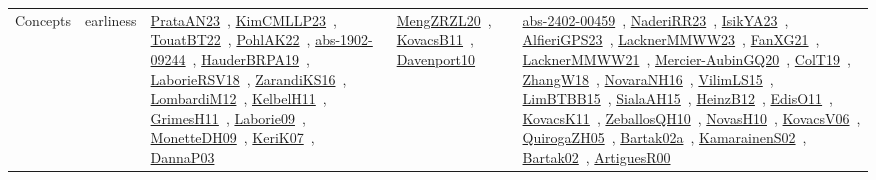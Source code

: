 {\begin{longtable}{lp{3cm}>{\raggedright\arraybackslash}p{6cm}>{\raggedright\arraybackslash}p{6cm}>{\raggedright\arraybackslash}p{8cm}}
Concepts & earliness & \href{articles/PrataAN23.pdf}{PrataAN23}~\cite{PrataAN23}, \href{papers/KimCMLLP23.pdf}{KimCMLLP23}~\cite{KimCMLLP23}, \href{papers/TouatBT22.pdf}{TouatBT22}~\cite{TouatBT22}, \href{articles/PohlAK22.pdf}{PohlAK22}~\cite{PohlAK22}, \href{articles/abs-1902-09244.pdf}{abs-1902-09244}~\cite{abs-1902-09244}, \href{articles/HauderBRPA19.pdf}{HauderBRPA19}~\cite{HauderBRPA19}, \href{articles/LaborieRSV18.pdf}{LaborieRSV18}~\cite{LaborieRSV18}, \href{articles/ZarandiKS16.pdf}{ZarandiKS16}~\cite{ZarandiKS16}, \href{articles/LombardiM12.pdf}{LombardiM12}~\cite{LombardiM12}, \href{articles/KelbelH11.pdf}{KelbelH11}~\cite{KelbelH11}, \href{papers/GrimesH11.pdf}{GrimesH11}~\cite{GrimesH11}, \href{papers/Laborie09.pdf}{Laborie09}~\cite{Laborie09}, \href{papers/MonetteDH09.pdf}{MonetteDH09}~\cite{MonetteDH09}, \href{papers/KeriK07.pdf}{KeriK07}~\cite{KeriK07}, \href{papers/DannaP03.pdf}{DannaP03}~\cite{DannaP03} & \href{articles/MengZRZL20.pdf}{MengZRZL20}~\cite{MengZRZL20}, \href{articles/KovacsB11.pdf}{KovacsB11}~\cite{KovacsB11}, \href{papers/Davenport10.pdf}{Davenport10}~\cite{Davenport10} & \href{articles/abs-2402-00459.pdf}{abs-2402-00459}~\cite{abs-2402-00459}, \href{articles/NaderiRR23.pdf}{NaderiRR23}~\cite{NaderiRR23}, \href{articles/IsikYA23.pdf}{IsikYA23}~\cite{IsikYA23}, \href{articles/AlfieriGPS23.pdf}{AlfieriGPS23}~\cite{AlfieriGPS23}, \href{articles/LacknerMMWW23.pdf}{LacknerMMWW23}~\cite{LacknerMMWW23}, \href{articles/FanXG21.pdf}{FanXG21}~\cite{FanXG21}, \href{papers/LacknerMMWW21.pdf}{LacknerMMWW21}~\cite{LacknerMMWW21}, \href{papers/Mercier-AubinGQ20.pdf}{Mercier-AubinGQ20}~\cite{Mercier-AubinGQ20}, \href{papers/ColT19.pdf}{ColT19}~\cite{ColT19}, \href{articles/ZhangW18.pdf}{ZhangW18}~\cite{ZhangW18}, \href{articles/NovaraNH16.pdf}{NovaraNH16}~\cite{NovaraNH16}, \href{papers/VilimLS15.pdf}{VilimLS15}~\cite{VilimLS15}, \href{papers/LimBTBB15.pdf}{LimBTBB15}~\cite{LimBTBB15}, \href{papers/SialaAH15.pdf}{SialaAH15}~\cite{SialaAH15}, \href{papers/HeinzB12.pdf}{HeinzB12}~\cite{HeinzB12}, \href{papers/EdisO11.pdf}{EdisO11}~\cite{EdisO11}, \href{articles/KovacsK11.pdf}{KovacsK11}~\cite{KovacsK11}, \href{articles/ZeballosQH10.pdf}{ZeballosQH10}~\cite{ZeballosQH10}, \href{articles/NovasH10.pdf}{NovasH10}~\cite{NovasH10}, \href{papers/KovacsV06.pdf}{KovacsV06}~\cite{KovacsV06}, \href{papers/QuirogaZH05.pdf}{QuirogaZH05}~\cite{QuirogaZH05}, \href{papers/Bartak02a.pdf}{Bartak02a}~\cite{Bartak02a}, \href{papers/KamarainenS02.pdf}{KamarainenS02}~\cite{KamarainenS02}, \href{papers/Bartak02.pdf}{Bartak02}~\cite{Bartak02}, \href{articles/ArtiguesR00.pdf}{ArtiguesR00}~\cite{ArtiguesR00}\\

\end{longtable}}
